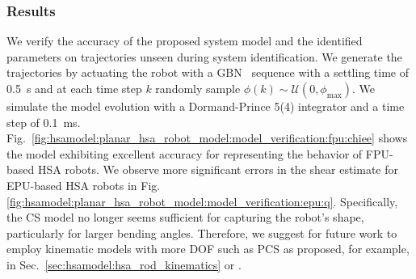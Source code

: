 \subsubsection{Results}\label{ssub:hsamodel:planar_hsa_robot_model:model_verification:results}
We verify the accuracy of the proposed system model and the identified parameters on trajectories unseen during system identification. We generate the trajectories by actuating the robot with a \gls{GBN}~\citep{tulleken1990generalized} sequence with a settling time of \SI{0.5}{s} and at each time step $k$ randomly sample $\phi(k) \sim \mathcal{U}(0, \phi_\mathrm{max})$.
We simulate the model evolution with a Dormand-Prince 5(4) integrator and a time step of \SI{0.1}{ms}.
Fig.~\ref{fig:hsamodel:planar_hsa_robot_model:model_verification:fpu:chiee} shows the model exhibiting excellent accuracy for representing the behavior of FPU-based \gls{HSA} robots.
We observe more significant errors in the shear estimate for EPU-based \gls{HSA} robots in Fig.\ref{fig:hsamodel:planar_hsa_robot_model:model_verification:epu:q}. Specifically, the \gls{CS} model no longer seems sufficient for capturing the robot's shape, particularly for larger bending angles. Therefore, we suggest for future work to employ kinematic models with more \gls{DOF} such as \gls{PCS} as proposed, for example, in Sec.~\ref{sec:hsamodel:hsa_rod_kinematics} or \citep{renda2018discrete}.
